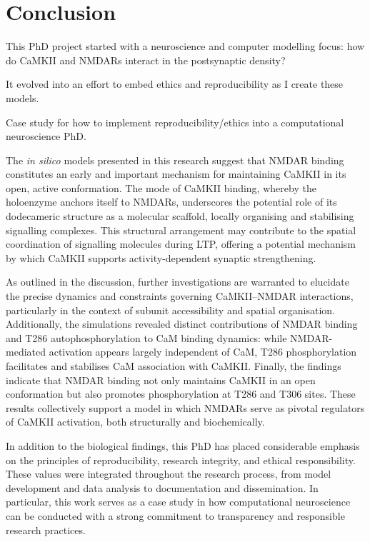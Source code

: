 \documentclass[
  11pt,
  letterpaper,
]{scrreprt}
\begin{document}

\chapter{Conclusion}\label{conclusion-1}

This PhD project started with a neuroscience and computer modelling
focus: how do CaMKII and NMDARs interact in the postsynaptic density?

It evolved into an effort to embed ethics and reproducibility as I
create these models.

Case study for how to implement reproducibility/ethics into a
computational neuroscience PhD.

The \emph{in silico} models presented in this research suggest that
NMDAR binding constitutes an early and important mechanism for
maintaining CaMKII in its open, active conformation. The mode of CaMKII
binding, whereby the holoenzyme anchors itself to NMDARs, underscores
the potential role of its dodecameric structure as a molecular scaffold,
locally organising and stabilising signalling complexes. This structural
arrangement may contribute to the spatial coordination of signalling
molecules during LTP, offering a potential mechanism by which CaMKII
supports activity-dependent synaptic strengthening.

As outlined in the discussion, further investigations are warranted to
elucidate the precise dynamics and constraints governing CaMKII--NMDAR
interactions, particularly in the context of subunit accessibility and
spatial organisation. Additionally, the simulations revealed distinct
contributions of NMDAR binding and T286 autophosphorylation to CaM
binding dynamics: while NMDAR-mediated activation appears largely
independent of CaM, T286 phosphorylation facilitates and stabilises CaM
association with CaMKII. Finally, the findings indicate that NMDAR
binding not only maintains CaMKII in an open conformation but also
promotes phosphorylation at T286 and T306 sites. These results
collectively support a model in which NMDARs serve as pivotal regulators
of CaMKII activation, both structurally and biochemically.

In addition to the biological findings, this PhD has placed considerable
emphasis on the principles of reproducibility, research integrity, and
ethical responsibility. These values were integrated throughout the
research process, from model development and data analysis to
documentation and dissemination. In particular, this work serves as a
case study in how computational neuroscience can be conducted with a
strong commitment to transparency and responsible research practices.
\end{document}
